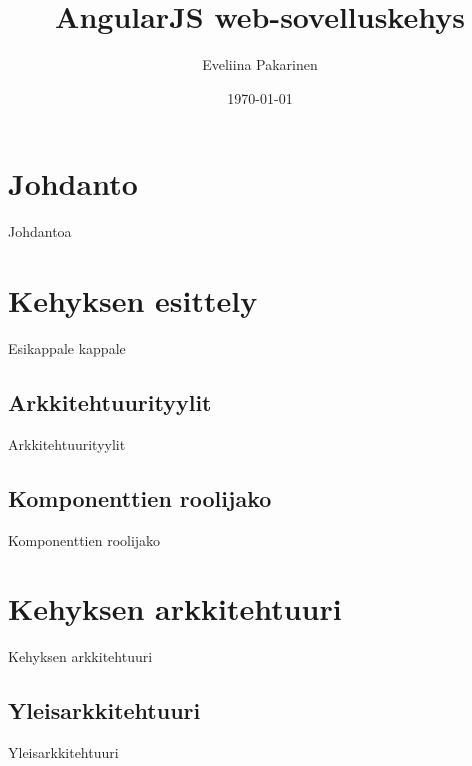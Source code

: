 \documentclass[finnish]{tktltiki2}
\title{AngularJS web-sovelluskehys}
\author{Eveliina Pakarinen}
\date{\today}
\theoremstyle{definition}
\theoremstyle{remark}
\numberwithin{figure}{section}
\begin{document}

\frontmatter      %

\maketitle        %
\makeabstract     %

\tableofcontents  %


\mainmatter       %

\setlength{\parindent}{2.5em}
\setlength{\parskip}{0em}
\renewcommand{\baselinestretch}{1.5}
\large

\section{Johdanto}

Johdantoa


\section{Kehyksen esittely}

Esikappale kappale

\subsection{Arkkitehtuurityylit}

Arkkitehtuurityylit 

\subsection{Komponenttien roolijako}

Komponenttien roolijako

\section{Kehyksen arkkitehtuuri}

Kehyksen arkkitehtuuri

\subsection{Yleisarkkitehtuuri}

Yleisarkkitehtuuri
\end{document}
